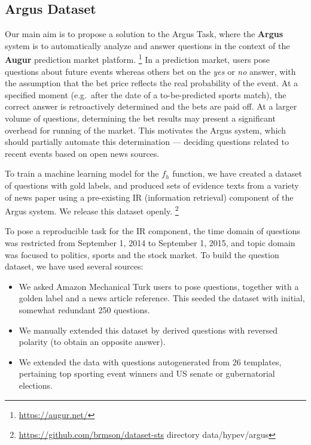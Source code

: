 \documentclass[11pt]{article}
\begin{document}
\subsection{Argus Dataset}

Our main aim is to propose a solution to the Argus Task, where
the \textbf{Argus} system \cite{arguswp} \cite{argus}
is to automatically analyze and answer questions
in the context of the \textbf{Augur} prediction market platform.%
\footnote{\url{https://augur.net/}}
In a prediction market, users pose questions about future events
whereas others bet on the \textit{yes} or \textit{no} answer,
with the assumption that the bet price reflects the real probability
of the event.  At a specified moment (e.g.\ after the date of a to-be-predicted sports match), the
correct answer is retroactively determined and the bets are paid off.
At a larger volume of questions, determining the bet results may
present a significant overhead for running of the market.
This motivates the Argus system, which should partially automate
this determination --- deciding questions related to recent events
based on open news sources.

To train a machine learning model for the $f_h$ function,
we have created a dataset of questions with gold labels, and
produced sets of evidence texts from a variety of news paper using
a pre-existing IR (information retrieval) component of the Argus system.
We release this dataset openly.%
\footnote{\url{https://github.com/brmson/dataset-sts} directory data/hypev/argus}

To pose a reproducible task for the IR component, the time domain
of questions was restricted from September 1, 2014 to September 1, 2015,
and topic domain was focused to politics, sports and the stock market.
To build the question dataset, we have used several sources:
\begin{itemize}
	\item We asked Amazon Mechanical Turk users to pose questions, together with a golden label and a news article reference.
		This seeded the dataset with initial, somewhat redundant 250 questions.
	\item We manually extended this dataset by derived questions with reversed polarity (to obtain an opposite answer).
	\item We extended the data with questions autogenerated from 26 templates, pertaining top sporting event winners and US senate or gubernatorial elections.
\end{itemize}
\end{document}
